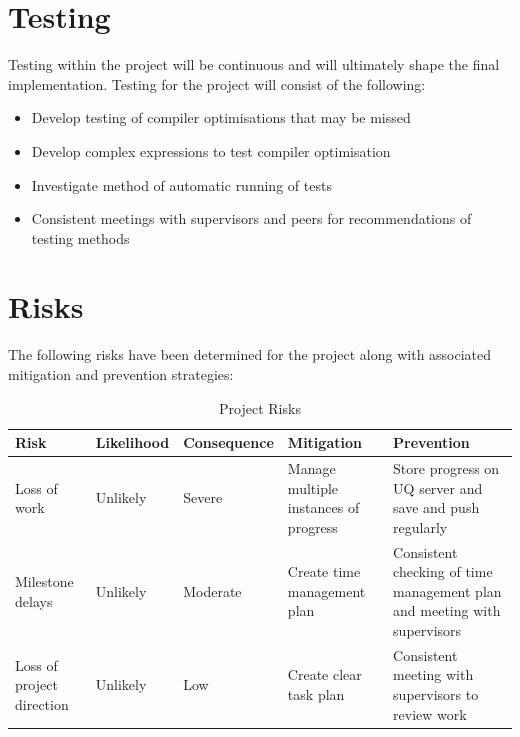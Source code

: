 \documentclass[12pt,openany,a4paper]{book}
\begin{document}
\section{Testing}
\label{testing}

Testing within the project will be continuous and will ultimately shape the
final implementation. Testing for the project will consist of the following:

\begin{itemize}
\item Develop testing of compiler optimisations that may be missed
\item Develop complex expressions to test compiler optimisation
\item Investigate method of automatic running of tests
\item Consistent meetings with supervisors and peers for recommendations of testing methods
\end{itemize}

\section{Risks}
\label{risks}

The following risks have been determined for the project along with associated
mitigation and prevention strategies:

\begin{table}[h]
    \centering
    \begin{tabular}{ |p{2cm}|p{2.1cm}|p{2.6cm}|p{4cm}|p{4cm}| }
        \hline
        \textbf{Risk} & \textbf{Likelihood} & \textbf{Consequence} & \textbf{Mitigation} & \textbf{Prevention}\\
        \hline
        Loss of work & Unlikely & Severe & Manage multiple instances of progress & Store progress on UQ server and save and push regularly\\
        \hline
        Milestone delays & Unlikely & Moderate & Create time management plan & Consistent checking of time management plan and meeting with supervisors\\
        \hline
        Loss of project direction & Unlikely & Low & Create clear task plan & Consistent meeting with supervisors to review work\\
        \hline
    \end{tabular}
    \caption{Project Risks}
    \label{project-risk-table}
\end{table}
\end{document}
